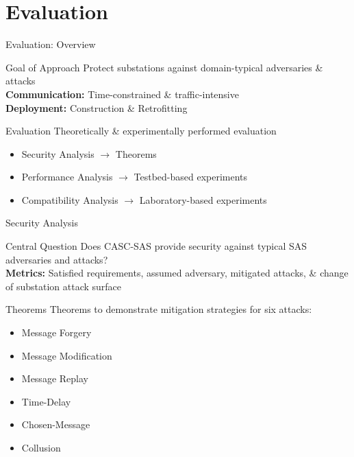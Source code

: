 \documentclass[en]{sdqbeamer}
\begin{document}
\section{Evaluation}
\begin{frame}{Evaluation: Overview}
    \begin{greenblock}{Goal of Approach}
        Protect substations against domain-typical adversaries \& attacks
        \\\textbf{Communication:} Time-constrained \& traffic-intensive
        \\\textbf{Deployment:} Construction \& Retrofitting
    \end{greenblock}
    \begin{blueblock}{Evaluation}
        Theoretically \& experimentally performed evaluation
        \begin{itemize}
            \item Security Analysis $\rightarrow$ Theorems
            \item Performance Analysis $\rightarrow$ Testbed-based experiments
            \item Compatibility Analysis $\rightarrow$ Laboratory-based experiments
        \end{itemize}
    \end{blueblock}
\end{frame}
\begin{frame}{Security Analysis}
    \begin{greenblock}{Central Question}
        Does CASC-SAS provide security against typical SAS adversaries and attacks?
        \\\textbf{Metrics:} Satisfied requirements, assumed adversary, mitigated attacks, \& change of substation attack surface
    \end{greenblock}
    \begin{blueblock}{Theorems}
        Theorems to demonstrate mitigation strategies for six attacks:
        \begin{itemize}
            \item Message Forgery
            \item Message Modification
            \item Message Replay
            \item Time-Delay
            \item Chosen-Message
            \item Collusion
        \end{itemize}
    \end{blueblock}
\end{frame}
\end{document}
